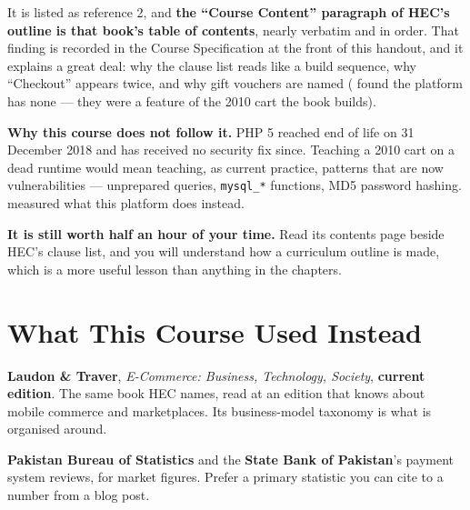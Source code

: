 \begin{alertbox}
It is listed as reference 2, and \textbf{the ``Course Content'' paragraph of
HEC's outline is that book's table of contents}, nearly verbatim and in order.
That finding is recorded in the Course Specification at the front of this
handout, and it explains a great deal: why the clause list reads like a build
sequence, why ``Checkout'' appears twice, and why gift vouchers are named
( found the platform has none --- they were a feature of the
2010 cart the book builds).

\smallskip
\textbf{Why this course does not follow it.} PHP 5 reached end of life on 31
December 2018 and has received no security fix since. Teaching a 2010 cart on
a dead runtime would mean teaching, as current practice, patterns that are now
vulnerabilities --- unprepared queries, \texttt{mysql\_*} functions, MD5
password hashing.  measured what this platform does instead.

\smallskip
\textbf{It is still worth half an hour of your time.} Read its contents page
beside HEC's clause list, and you will understand how a curriculum outline is
made, which is a more useful lesson than anything in the chapters.
\end{alertbox}

\section{What This Course Used Instead}

\begin{examplebox}
\begin{tight}
  \item \textbf{Laudon \& Traver}, \emph{E-Commerce: Business, Technology,
        Society}, \textbf{current edition}. The same book HEC names, read at
        an edition that knows about mobile commerce and marketplaces. Its
        business-model taxonomy is what  is organised around.
  \item \textbf{Pakistan Bureau of Statistics} and the \textbf{State Bank of
        Pakistan}'s payment system reviews, for market figures. Prefer a
        primary statistic you can cite to a number from a blog post.
\end{tight}
\end{examplebox}

